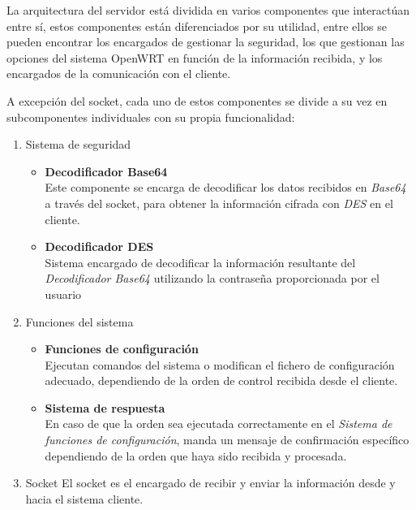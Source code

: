 \documentclass[12pt]{article}
\begin{document}
            La arquitectura del servidor está dividida en varios componentes que interactúan entre sí, estos componentes están diferenciados por su utilidad, entre ellos se pueden encontrar los encargados de gestionar la seguridad, los que gestionan las opciones del sistema OpenWRT en función de la información recibida, y los encargados de la comunicación con el cliente.

            A excepción del socket, cada uno de estos componentes se divide a su vez en subcomponentes individuales con su propia funcionalidad:

            \begin{enumerate}
                \item Sistema de seguridad
                    \begin{itemize}
                        \item \textbf{Decodificador Base64} \\
                            Este componente se encarga de decodificar los datos recibidos en \textit{Base64} a través del socket, para obtener la información cifrada con \textit{DES} en el cliente.
                        \item \textbf{Decodificador DES} \\ 
                            Sistema encargado de decodificar la información resultante del \textit{Decodificador Base64} utilizando la contraseña proporcionada por el usuario
                    \end{itemize}
                \item Funciones del sistema
                    \begin{itemize}
                        \item \textbf{Funciones de configuración} \\ 
                            Ejecutan comandos del sistema o modifican el fichero de configuración adecuado, dependiendo de la orden de control recibida desde el cliente.
                        \item \textbf{Sistema de respuesta} \\
                            En caso de que la orden sea ejecutada correctamente en el \textit{Sistema de funciones de configuración}, manda un mensaje de confirmación específico dependiendo de la orden que haya sido recibida y procesada.
                    \end{itemize}
                \item Socket
                    El socket es el encargado de recibir y enviar la información desde y hacia el sistema cliente.
            \end{enumerate}
\end{document}

